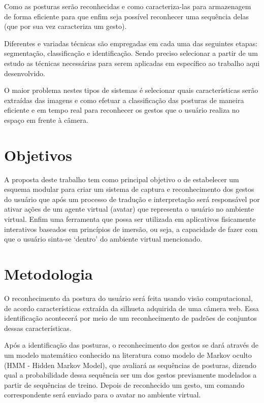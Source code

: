 Como as posturas serão reconhecidas e como caracteriza-las para armazenagem de forma eficiente para que enfim seja possível reconhecer uma sequência delas (que por sua vez caracteriza um gesto).

Diferentes e variadas técnicas são empregadas em cada uma das seguintes etapas: segmentação, classificação e identificação. Sendo preciso selecionar a partir de um estudo as técnicas necessárias para serem aplicadas em específico ao trabalho aqui desenvolvido.

O maior problema nestes tipos de sistemas é selecionar quais características serão extraídas das imagens e como efetuar a classificação das posturas de maneira eficiente e em tempo real para reconhecer os gestos que o usuário realiza no espaço em frente à câmera. 

\section{Objetivos}

A proposta deste trabalho tem como principal objetivo o de estabelecer um esquema modular para criar um sistema de captura e reconhecimento dos gestos do usuário que após um processo de tradução e interpretação será responsável por ativar ações de um agente virtual (avatar) que representa o usuário no ambiente virtual. Enfim uma ferramenta que possa ser utilizada em aplicativos fisicamente interativos baseados em princípios de imersão, ou seja, a capacidade de fazer com que o usuário sinta-se `dentro' do ambiente virtual mencionado.

\section{Metodologia}

O reconhecimento da postura do usuário será feita usando visão computacional, de acordo características extraída da silhueta adquirida de uma câmera web. Essa identificação acontecerá por meio de um reconhecimento de padrões de conjuntos dessas características.

Após a identificação das posturas, o reconhecimento dos gestos se dará através de um modelo matemático conhecido na literatura como modelo de Markov oculto (HMM - Hidden Markov Model), que avaliará as sequências de posturas, dizendo qual a probabilidade dessa sequência ser um dos gestos previamente modelados a partir de sequências de treino. Depois de reconhecido um gesto, um comando correspondente será enviado para o avatar no ambiente virtual.

